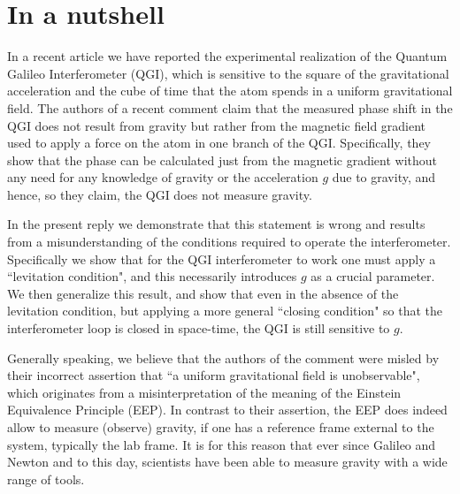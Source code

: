 \documentclass[aps,prx,onecolumn,superscriptaddress,longbibliography]{revtex4-2}
\begin{document}
\author{Ron Folman}

\date{\today}

\begin{abstract}
We show that in contrast to a recent claim, the Quantum Galileo Interferometer is sensitive to a uniform gravitational field in the presence and even in the absence of the levitation condition.
\end{abstract}




\maketitle

\section{In a nutshell}

In a recent article \cite{QGI} we have reported the experimental realization of the Quantum Galileo Interferometer (QGI), which is sensitive to the square of the gravitational acceleration and the cube of time that the atom spends in a uniform gravitational field. The authors of a recent comment \cite{QGI-comment} claim that the measured phase shift in the QGI does not result from gravity but rather from the magnetic field gradient used to apply a force on the atom in one branch of the QGI. Specifically, they show that the phase can be calculated just from the magnetic gradient without any need for any knowledge of gravity or the acceleration $g$ due to gravity, and hence, so they claim, the QGI does not measure gravity. 

In the present reply we demonstrate that this statement is wrong and results from a misunderstanding of the conditions required to operate the interferometer. Specifically we show that for the QGI interferometer to work one must apply a ``levitation condition", and this necessarily introduces $g$ as a crucial parameter. We then generalize this result, and show that even in the absence of the levitation condition, but applying a more general ``closing condition" so that the interferometer loop is closed in space-time, the QGI is still sensitive to $g$. 

Generally speaking, we believe that the authors of the comment were misled by their incorrect assertion that ``a uniform gravitational field is unobservable", which originates from a misinterpretation of the meaning of the Einstein Equivalence Principle (EEP). In contrast to their assertion, the EEP does indeed allow to measure (observe) gravity, if one has a reference frame external to the system, typically the lab frame. It is for this reason that ever since Galileo and Newton and to this day, scientists have been able to measure gravity with a wide range of tools.
\end{document}
